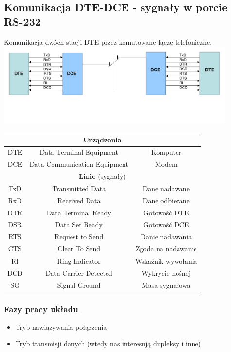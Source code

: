 \documentclass[a4paper,twoside]{article}
\begin{document}
	\subsection{Komunikacja DTE-DCE - sygnały w porcie RS-232}
	Komunikacja dwóch stacji DTE przez komutowane łącze telefoniczne.\\
	\includegraphics[width=12cm]{./wyklady/RS232_6_1.pdf}\\
	\begin{table}[h]
		\begin{tabular}{|c|c|c|}
			\hline
			\multicolumn{3}{|c|}{\textbf{Urządzenia}}                        \\ \hline
			\multicolumn{1}{|c|}{DTE} & Data Terminal Equipment      & Komputer           \\ \hline
			\multicolumn{1}{|c|}{DCE} & Data Communication Equipment & Modem              \\ \hline
			\multicolumn{3}{|c|}{\textbf{Linie} (sygnały)}                   \\ \hline
			TxD & Transmitted Data             & Dane nadawane      \\ \hline
			RxD & Received Data                & Dane odbierane     \\ \hline
			DTR & Data Terminal Ready          & Gotowość DTE       \\ \hline
			DSR & Data Set Ready               & Gotowość DCE       \\ \hline
			RTS & Request to Send              & Danie nadawania    \\ \hline
			CTS & Clear To Send                & Zgoda na nadawanie \\ \hline
			RI  & Ring Indicator               & Wskaźnik wywołania \\ \hline
			DCD & Data Carrier Detected        & Wykrycie nośnej    \\ \hline
			SG  & Signal Ground                & Masa sygnałowa     \\ \hline
		\end{tabular}
	\end{table}
		\subsubsection{Fazy pracy układu}
		\begin{itemize}
			\item Tryb nawiązywania połączenia
			\item Tryb transmisji danych (wtedy nas interesują dupleksy i inne)
		\end{itemize}
\end{document}
